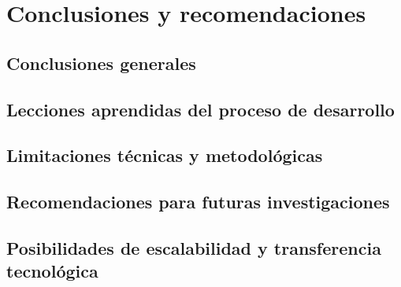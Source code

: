 \chapter{Conclusiones y recomendaciones}
\label{chap:conclusions_recommendations}

\section{Conclusiones generales}
\label{sec:general_conclusions}

\section{Lecciones aprendidas del proceso de desarrollo}
\label{sec:lessons_learned}

\section{Limitaciones técnicas y metodológicas}
\label{sec:limitations}

\section{Recomendaciones para futuras investigaciones}
\label{sec:future_recommendations}

\section{Posibilidades de escalabilidad y transferencia tecnológica}
\label{sec:scalability_transfer}
